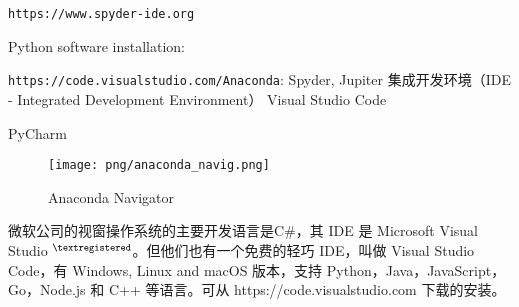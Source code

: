 \documentclass[main.tex]{subfiles}
\begin{document}
	
\verb|https://www.spyder-ide.org|

Python software installation:

\verb|https://code.visualstudio.com/Anaconda|: Spyder, Jupiter
集成开发环境（IDE - Integrated Development Environment）
Visual Studio Code

PyCharm

\begin{figure}[h]
	\centering
	\texttt{[image: png/anaconda\_navig.png]}
	\caption{Anaconda Navigator}
	\label{fig:III.1.3}
\end{figure}


微软公司的视窗操作系统的主要开发语言是C\#，其 IDE 是 Microsoft Visual Studio ${}^{\textregistered}$。但他们也有一个免费的轻巧 IDE，叫做 Visual Studio Code，有 Windows, Linux and macOS 版本，支持 Python，Java，JavaScript，Go，Node.js 和 C++ 等语言。可从
https://code.visualstudio.com
下载的安装。
\end{document}
